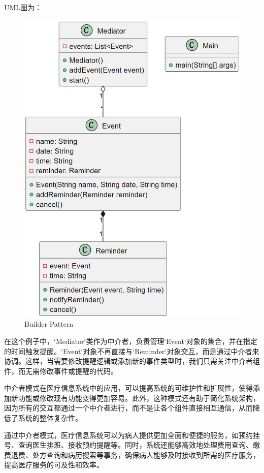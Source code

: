 UML图为：
\begin{figure}[htbp]
	\centering
	\includegraphics[width=0.3\textheight]{figures/14.png}
	\caption{Builder Pattern}
\end{figure}
在这个例子中，`Mediator`类作为中介者，负责管理`Event`对象的集合，并在指定的时间触发提醒。`Event`对象不再直接与`Reminder`对象交互，而是通过中介者来协调。这样，当需要修改提醒逻辑或添加新的事件类型时，我们只需关注中介者组件，而无需修改事件或提醒的代码。

中介者模式在医疗信息系统中的应用，可以提高系统的可维护性和扩展性，使得添加新功能或修改现有功能变得更加容易。此外，这种模式还有助于简化系统架构，因为所有的交互都通过一个中介者进行，而不是让各个组件直接相互通信，从而降低了系统的整体复杂性。

通过中介者模式，医疗信息系统可以为病人提供更加全面和便捷的服务，如预约挂号、查询医生排班、接收预约提醒等。同时，系统还能够高效地处理费用查询、缴费退费、处方查询和病历搜索等事务，确保病人能够及时接收到所需的医疗服务，提高医疗服务的可及性和效率。

